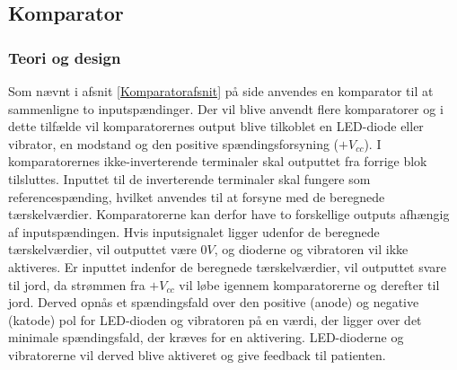 \subsection{Komparator}
\subsubsection{Teori og design}
Som nævnt i afsnit \ref{Komparatorafsnit} på side \pageref{Komparatorafsnit} anvendes en komparator til at sammenligne to inputspændinger. Der vil blive anvendt flere komparatorer og i dette tilfælde vil komparatorernes output blive tilkoblet en LED-diode eller vibrator, en modstand og den positive spændingsforsyning ($+V_{cc}$). I komparatorernes ikke-inverterende terminaler skal outputtet fra forrige blok tilsluttes. Inputtet til de inverterende terminaler skal fungere som referencespænding, hvilket anvendes til at forsyne med de beregnede tærskelværdier. Komparatorerne kan derfor have to forskellige outputs afhængig af inputspændingen. Hvis inputsignalet ligger udenfor de beregnede tærskelværdier, vil outputtet være $0V$, og dioderne og vibratoren vil ikke aktiveres. Er inputtet indenfor de beregnede tærskelværdier, vil outputtet svare til jord, da strømmen fra $+V_{cc}$ vil løbe igennem komparatorerne og derefter til jord. Derved opnås et spændingsfald over den positive (anode) og negative (katode) pol for LED-dioden og vibratoren på en værdi, der ligger over det minimale spændingsfald, der kræves for en aktivering. LED-dioderne og vibratorerne vil derved blive aktiveret og give feedback til patienten. \\

